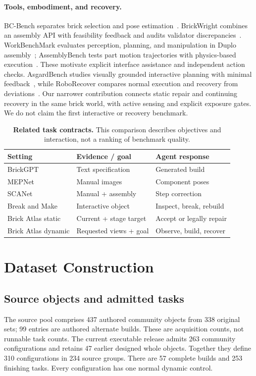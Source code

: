 \documentclass[10pt,twocolumn,letterpaper]{article}
\newcommand{\ours}{Brick Atlas\xspace}\newcommand{\sig}{\sigma}
\begin{document}
\paragraph{Tools, embodiment, and recovery.}
BC-Bench separates brick selection and pose estimation~\cite{liu2026brickcomposer}. BrickWright combines an assembly API with feasibility feedback and audits validator discrepancies~\cite{pun2026brickwright}. WorkBenchMark evaluates perception, planning, and manipulation in Duplo assembly~\cite{ma2026workbenchmark}; AssemblyBench tests part motion trajectories with physics-based execution~\cite{li2026assemblybench}. These motivate explicit interface assistance and independent action checks. AsgardBench studies visually grounded interactive planning with minimal feedback~\cite{tupini2026asgard}, while RoboRecover compares normal execution and recovery from deviations~\cite{li2026roborecover}. Our narrower contribution connects static repair and continuing recovery in the same brick world, with active sensing and explicit exposure gates. We do not claim the first interactive or recovery benchmark.

\begin{table}[t]\centering\small
\caption{\textbf{Related task contracts.} This comparison describes objectives and interaction, not a ranking of benchmark quality.}
\label{tab:related}
\begin{tabularx}{\linewidth}{@{}lYY@{}}\toprule
Setting & Evidence / goal & Agent response\\\midrule
BrickGPT & Text specification & Generated build\\
MEPNet & Manual images & Component poses\\
SCANet & Manual + assembly & Step correction\\
Break and Make & Interactive object & Inspect, break, rebuild\\
\ours static & Current + stage target & Accept or legally repair\\
\ours dynamic & Requested views + goal & Observe, build, recover\\\bottomrule
\end{tabularx}\end{table}

\section{Dataset Construction}
\subsection{Source objects and admitted tasks}
The source pool comprises 437 authored community objects from 338 original sets; 99 entries are authored alternate builds. These are acquisition counts, not runnable task counts. The current executable release admits 263 community configurations and retains 47 earlier designed whole objects. Together they define 310 configurations in 234 source groups. There are 57 complete builds and 253 finishing tasks. Every configuration has one normal dynamic control.
\end{document}
